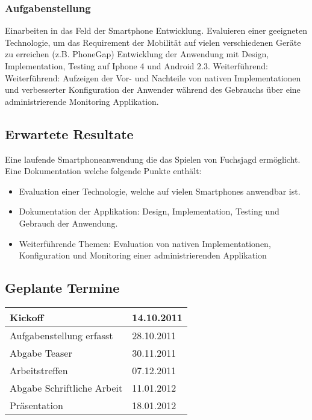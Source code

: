 \subsubsection{Aufgabenstellung} %
\label{ssub:Aufgabenstellung}
Einarbeiten in das Feld der Smartphone Entwicklung.
Evaluieren einer geeigneten Technologie, um das Requirement der Mobilität auf vielen verschiedenen Geräte zu erreichen (z.B. PhoneGap)
Entwicklung der Anwendung mit Design, Implementation, Testing auf Iphone 4 und Android 2.3.
Weiterführend:
Weiterführend: Aufzeigen der Vor- und Nachteile von nativen Implementationen und verbesserter Konfiguration der Anwender während des Gebrauchs über eine administrierende Monitoring Applikation.

\subsection{Erwartete Resultate} %
\label{sub:Erwartete Resultate}
Eine laufende Smartphoneanwendung die das Spielen von Fuchsjagd ermöglicht.
Eine Dokumentation welche folgende Punkte enthält:
\begin{itemize}
    \item Evaluation einer Technologie, welche auf vielen Smartphones anwendbar ist.
    \item Dokumentation der Applikation: Design, Implementation, Testing und Gebrauch der Anwendung.
    \item Weiterführende Themen: Evaluation von nativen Implementationen, Konfiguration und Monitoring einer administrierenden Applikation
\end{itemize}


\subsection{Geplante Termine} %
\label{sub:Geplante Termine}

\begin{tabular}{|l|l|}
\hline
                   Kickoff & 14.10.2011\\
\hline
  Aufgabenstellung erfasst & 28.10.2011\\
\hline
             Abgabe Teaser & 30.11.2011\\
\hline
            Arbeitstreffen &  07.12.2011\\
\hline
Abgabe Schriftliche Arbeit &  11.01.2012\\
\hline
             Präsentation &  18.01.2012\\
\hline
\end{tabular}

